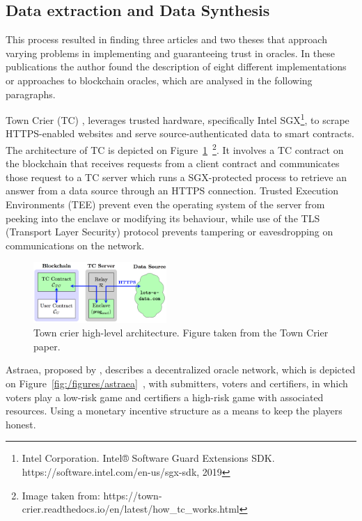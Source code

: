 \subsection{Data extraction and Data Synthesis}

This process resulted in finding three articles and two theses that approach varying problems in implementing and guaranteeing trust in oracles. In these publications the author found the description of eight different implementations or approaches to blockchain oracles, which are analysed in the following paragraphs.

Town Crier (TC) \cite{Zhang2016a}, leverages trusted hardware, specifically Intel SGX\footnote{Intel Corporation. Intel® Software Guard Extensions SDK. https://software.intel.com/en-us/sgx-sdk, 2019}, to scrape HTTPS-enabled websites and serve source-authenticated data to smart contracts. The architecture of TC is depicted on Figure~\ref{fig:/figures/town-crier}~\footnote{Image taken from: https://town-crier.readthedocs.io/en/latest/how\_tc\_works.html}. It involves a TC contract on the blockchain that receives requests from a client contract and communicates those request to a TC server which runs a SGX-protected process to retrieve an answer from a data source through an HTTPS connection. Trusted Execution Environments (TEE) prevent even the operating system of the server from peeking into the enclave or modifying its behaviour, while use of the TLS (Transport Layer Security) protocol prevents tampering or eavesdropping on communications on the network.

\begin{figure}[H]
  \begin{center}
    \leavevmode
    \includegraphics[width=0.45\textwidth]{figures/town-crier.png}
    \caption{Town crier high-level architecture. Figure taken from the Town Crier paper.}
    \label{fig:/figures/town-crier}
  \end{center}
\end{figure}


Astraea, proposed by \citet{Adler2018}, describes a decentralized oracle network, which is depicted on Figure~\ref{fig:/figures/astraea}~\cite{Adler2018a}, with submitters, voters and certifiers, in which voters play a low-risk game and certifiers a high-risk game with associated resources. Using a monetary incentive structure as a means to keep the players honest.

